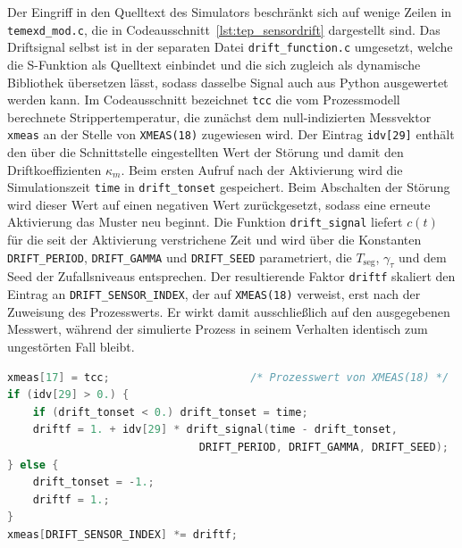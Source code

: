 Der Eingriff in den Quelltext des Simulators beschränkt sich auf wenige Zeilen in \texttt{temexd\_mod.c}, die in Codeausschnitt~\ref{lst:tep_sensordrift} dargestellt sind. Das Driftsignal selbst ist in der separaten Datei \texttt{drift\_function.c} umgesetzt, welche die S-Funktion als Quelltext einbindet und die sich zugleich als dynamische Bibliothek übersetzen lässt, sodass dasselbe Signal auch aus Python ausgewertet werden kann. Im Codeausschnitt bezeichnet \texttt{tcc} die vom Prozessmodell berechnete Strippertemperatur, die zunächst dem null-indizierten Messvektor \texttt{xmeas} an der Stelle von \texttt{XMEAS(18)} zugewiesen wird. Der Eintrag \texttt{idv[29]} enthält den über die Schnittstelle eingestellten Wert der Störung und damit den Driftkoeffizienten $\kappa_m$. Beim ersten Aufruf nach der Aktivierung wird die Simulationszeit \texttt{time} in \texttt{drift\_tonset} gespeichert. Beim Abschalten der Störung wird dieser Wert auf einen negativen Wert zurückgesetzt, sodass eine erneute Aktivierung das Muster neu beginnt. Die Funktion \texttt{drift\_signal} liefert $c(t)$ für die seit der Aktivierung verstrichene Zeit und wird über die Konstanten \texttt{DRIFT\_PERIOD}, \texttt{DRIFT\_GAMMA} und \texttt{DRIFT\_SEED} parametriert, die $T_{\mathrm{seg}}$, $\gamma_\tau$ und dem Seed der Zufallsniveaus entsprechen. Der resultierende Faktor \texttt{driftf} skaliert den Eintrag an \texttt{DRIFT\_SENSOR\_INDEX}, der auf \texttt{XMEAS(18)} verweist, erst nach der Zuweisung des Prozesswerts. Er wirkt damit ausschließlich auf den ausgegebenen Messwert, während der simulierte Prozess in seinem Verhalten identisch zum ungestörten Fall bleibt. \par
%
\begin{lstlisting}[language=C, float=tb,
    caption={Anwendung des Sensordrifts in \texttt{temexd\_mod.c}, gekürzt und vereinfacht},
    label={lst:tep_sensordrift}]
xmeas[17] = tcc;                      /* Prozesswert von XMEAS(18) */
if (idv[29] > 0.) {
    if (drift_tonset < 0.) drift_tonset = time;
    driftf = 1. + idv[29] * drift_signal(time - drift_tonset,
                              DRIFT_PERIOD, DRIFT_GAMMA, DRIFT_SEED);
} else {
    drift_tonset = -1.;
    driftf = 1.;
}
xmeas[DRIFT_SENSOR_INDEX] *= driftf;
\end{lstlisting}
%
